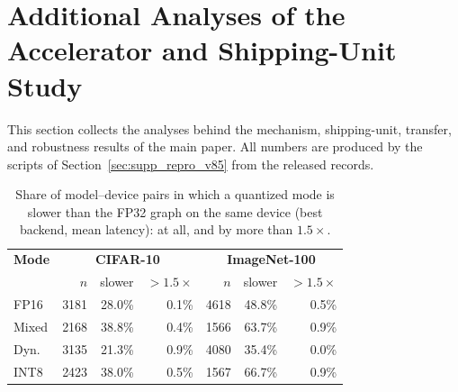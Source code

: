\section{Additional Analyses of the Accelerator and Shipping-Unit Study}
\label{sec:supp_v85}

This section collects the analyses behind the mechanism, shipping-unit, transfer, and robustness results of the main paper. All numbers are produced by the scripts of Section~\ref{sec:supp_repro_v85} from the released records.

\begin{table}[!t]
\centering
\caption{Share of model--device pairs in which a quantized mode is slower than the FP32 graph on the same device (best backend, mean latency): at all, and by more than $1.5\times$.}
\label{tab:slower}
\footnotesize
\setlength{\tabcolsep}{3pt}
\begin{tabular}{@{}lrrrrrr@{}}
\toprule
\textbf{Mode} & \multicolumn{3}{c}{\textbf{CIFAR-10}} & \multicolumn{3}{c}{\textbf{ImageNet-100}} \\
 & $n$ & slower & $>1.5\times$ & $n$ & slower & $>1.5\times$ \\
\midrule
FP16 & 3181 & 28.0\% & 0.1\% & 4618 & 48.8\% & 0.5\% \\
Mixed & 2168 & 38.8\% & 0.4\% & 1566 & 63.7\% & 0.9\% \\
Dyn. & 3135 & 21.3\% & 0.9\% & 4080 & 35.4\% & 0.0\% \\
INT8 & 2423 & 38.0\% & 0.5\% & 1567 & 66.7\% & 0.9\% \\
\bottomrule
\end{tabular}
\end{table}

